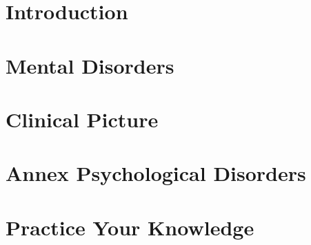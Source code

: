 \documentclass[../main.tex]{subfiles}
\begin{document}
\chapter{Introduction}



\chapter{Mental Disorders}

\label{sec:suicide}
\chapter{Clinical Picture}

\chapter{Annex Psychological Disorders}

\chapter{Practice Your Knowledge}

~\cite{EQDE} %
\end{document}
